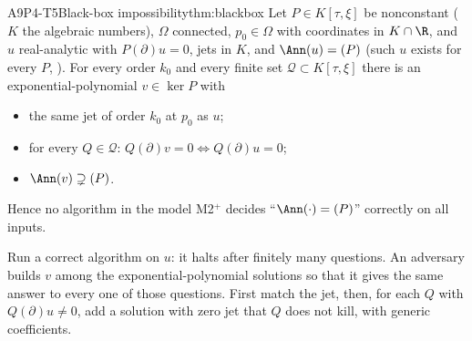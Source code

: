 \begin{dimcard}{A9}{P4-T5}{Black-box impossibility}{\proved}{thm:blackbox}
Let $P\in K[\tau,\xi]$ be nonconstant ($K$ the algebraic numbers), $\Omega$ connected, $p_0\in\Omega$ with coordinates in $K\cap\R$, and $u$ real-analytic with $P(\partial)u=0$, jets in $K$, and $\Ann(u)=(P)$ (such $u$ exists for every $P$, ). For every order $k_0$ and every finite set $\mathcal Q\subset K[\tau,\xi]$ there is an exponential-polynomial $v\in\ker P$ with
\begin{itemize}
\item the same jet of order $k_0$ at $p_0$ as $u$;
\item for every $Q\in\mathcal Q$: $Q(\partial)v=0\iff Q(\partial)u=0$;
\item $\Ann(v)\supsetneq(P)$.
\end{itemize}
Hence no algorithm in the model M2$^+$ decides ``$\Ann(\cdot)=(P)$'' correctly on all inputs.
\end{dimcard}

\begin{proofidea}
Run a correct algorithm on $u$: it halts after finitely many questions. An adversary builds $v$ among the exponential-polynomial solutions so that it gives the same answer to every one of those questions. First match the jet, then, for each $Q$ with $Q(\partial)u\ne0$, add a solution with zero jet that $Q$ does not kill, with generic coefficients.
\end{proofidea}

